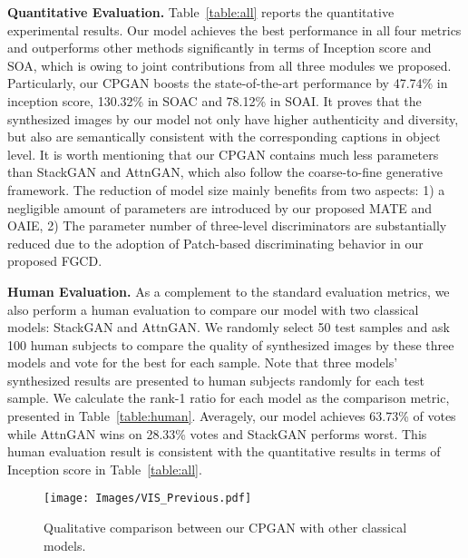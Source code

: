 \documentclass[runningheads]{llncs}
\begin{document}
\setlength{\tabcolsep}{1.4pt} 
\smallskip\noindent\textbf{Quantitative Evaluation.} Table~\ref{table:all} reports the quantitative experimental results. Our model achieves the best performance in all four metrics and outperforms other methods significantly in terms of Inception score and SOA, which is owing to joint contributions from all three modules we proposed. Particularly, our CPGAN boosts the state-of-the-art performance by 47.74\% in inception score, 130.32\% in SOA\text{-}C and 78.12\% in SOA\text{-}I.
It proves that the synthesized images by our model not only have higher authenticity and diversity, but also are semantically consistent with the corresponding captions in object level. 
It is worth mentioning that our CPGAN contains much less parameters than StackGAN and AttnGAN, which also follow the coarse-to-fine generative framework. The reduction of model size mainly benefits from two aspects: 1) a negligible amount of parameters are introduced by our proposed MATE and OAIE, 2) The parameter number of three-level discriminators are substantially reduced due to the adoption of Patch-based discriminating behavior in our proposed FGCD.


\smallskip\noindent\textbf{Human Evaluation.}
As a complement to the standard evaluation metrics, we also perform a human evaluation to
compare our model with two classical models: StackGAN and AttnGAN. We randomly select 50 test samples and ask 100 human subjects to compare the quality of synthesized images by these three models and vote for the best for each sample. Note that three models' synthesized results are presented to human subjects randomly for each test sample. We calculate the rank-1 ratio for each model as the comparison metric, presented in Table~\ref{table:human}. Averagely, our model achieves 63.73\% of votes while AttnGAN wins on 28.33\% votes and StackGAN performs worst. This human evaluation result is consistent with the quantitative results in terms of Inception score in Table~\ref{table:all}. 

\begin{figure}[t]
\centering
\texttt{[image: Images/VIS\_Previous.pdf]}
\caption{Qualitative comparison between our CPGAN with other classical models.}
\label{fig:compare_vis}
\end{figure}
\end{document}
